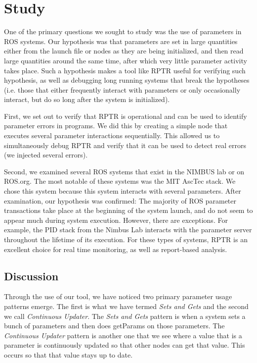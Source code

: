 \section{Study}

One of the primary questions we sought to study was the use of parameters in ROS systems. Our hypothesis was that parameters are set in large quantities either from the launch file or nodes as they are being initialized, and then read large quantities around the same time, after which very little parameter activity takes place. Such a hypothesis makes a tool like RPTR useful for verifying such hypothesis, as well as debugging long running systems that break the hypotheses (i.e. those that either frequently interact with parameters or only occasionally interact, but do so long after the system is initialized).

First, we set out to verify that RPTR is operational and can be used to identify parameter errors in programs. We did this by creating a simple node that executes several parameter interactions sequentially. This allowed us to simultaneously debug RPTR and verify that it can be used to detect real errors (we injected several errors).

Second, we examined several ROS systems that exist in the NIMBUS lab or on ROS.org. The most notable of these systems was the MIT AscTec stack. We chose this system because this system interacts with several parameters.  
After examination, our hypothesis was confirmed: The majority of ROS parameter transactions take place at the beginning of the system launch, and do not seem to appear much during system execution. However, there are exceptions. For example, the PID stack from the Nimbus Lab interacts with the parameter server throughout the lifetime of its execution. For these types of systems, RPTR is an excellent choice for real time monitoring, as well as report-based analysis.

\subsection{Discussion}

Through the use of our tool, we have noticed two primary parameter usage patterns emerge. The first is what we have termed \emph{Sets and Gets} and the second we call \emph{Continuous Updater}. The \emph{Sets and Gets} pattern is when a system sets a bunch of parameters and then does getParams on those parameters. The \emph{Continuous Updater} pattern is another one that we see where a value that is a parameter is continuously updated so that other nodes can get that value. This occurs so that that value stays up to date.
